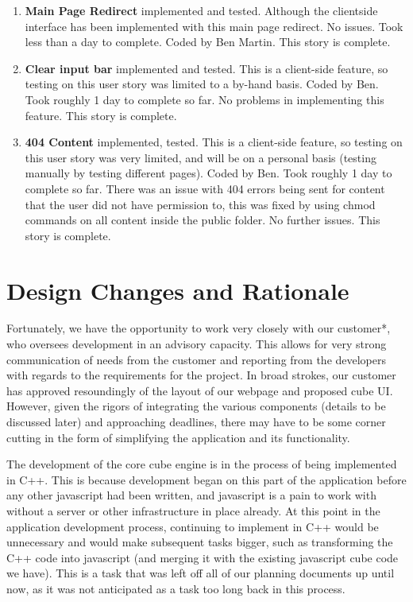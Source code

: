 \documentclass[12pt]{article}
\begin{document}
\begin{enumerate}
	\item \textbf{Main Page Redirect} implemented and tested. Although the clientside interface has been implemented with this main page redirect. No issues. Took less than a day to complete. Coded by Ben Martin. This story is complete.
	\item \textbf{Clear input bar} implemented and tested. This is a client-side feature, so testing on this user story was limited to a by-hand basis. Coded by Ben. Took roughly 1 day to complete so far. No problems in implementing this feature. This story is complete.
	\item \textbf{404 Content} implemented, tested. This is a client-side feature, so testing on this user story was very limited, and will be on a personal basis (testing manually by testing different pages). Coded by Ben. Took roughly 1 day to complete so far. There was an issue with 404 errors being sent for content that the user did not have permission to, this was fixed by using chmod commands on all content inside the public folder. No further issues. This story is complete.
\end{enumerate}
	

\section{Design Changes and Rationale}

\par Fortunately, we have the opportunity to work very closely with our customer*, who oversees development in an advisory capacity. This allows for very strong communication of needs from the customer and reporting from the developers with regards to the requirements for the project. In broad strokes, our customer has approved resoundingly of the layout of our webpage and proposed cube UI. However, given the rigors of integrating the various components (details to be discussed later) and approaching deadlines, there may have to be some corner cutting in the form of simplifying the application and its functionality. \\

\par The development of the core cube engine is in the process of being implemented in C++. This is because development began on this part of the application before any other javascript had been written, and javascript is a pain to work with without a server or other infrastructure in place already. At this point in the application development process, continuing to implement in C++ would be unnecessary and would make subsequent tasks bigger, such as transforming the C++ code into javascript (and merging it with the existing javascript cube code we have). This is a task that was left off all of our planning documents up until now, as it was not anticipated as a task too long back in this process. \\
\end{document}
